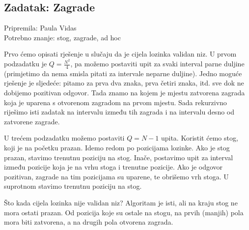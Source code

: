 \subsection*{Zadatak: Zagrade}
\textsf{Pripremila: Paula Vidas}\\
\textsf{Potrebno znanje: stog, zagrade, ad hoc}

Prvo ćemo opisati rješenje u slučaju da je cijela lozinka validan niz. U prvom
podzadatku je $Q = \frac{N^2}{4}$, pa možemo postaviti upit za svaki interval
parne duljine (primjetimo da nema smisla pitati za intervale neparne duljine).
Jedno moguće rješenje je sljedeće: pitamo za prva dva znaka, prva četiri znaka,
itd. sve dok ne dobijemo pozitivan odgovor. Tada znamo na kojem je mjestu
zatvorena zagrada koja je uparena s otvorenom zagradom na prvom mjestu. Sada
rekurzivno riješimo isti zadatak na intervalu između tih zagrada i na intervalu
desno od zatvorene zagrade.

U trećem podzadatku možemo postaviti $Q = N - 1$ upita. Koristit ćemo stog, koji
je na početku prazan. Idemo redom po pozicijama lozinke. Ako je stog prazan,
stavimo trenutnu poziciju na stog. Inače, postavimo upit za interval između
pozicije koja je na vrhu stoga i trenutne pozicije. Ako je odgovor pozitivan,
zagrade na tim pozicijama su uparene, te obrišemo vrh stoga. U suprotnom stavimo
trenutnu poziciju na stog.

Što kada cijela lozinka nije validan niz? Algoritam je isti, ali na kraju stog
ne mora ostati prazan. Od pozicija koje su ostale na stogu, na prvih (manjih)
pola mora biti zatvorena, a na drugih pola otvorena zagrada.
